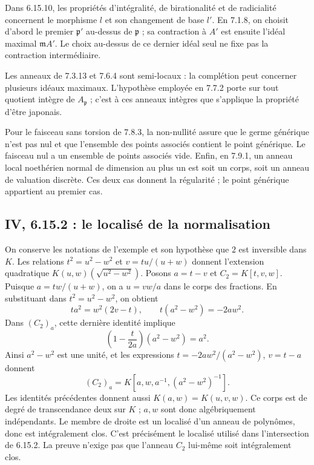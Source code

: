 \documentclass[11pt,a4paper]{article}
\begin{document}
Dans 6.15.10, les propriétés d'intégralité, de birationalité et de
radicialité concernent le morphisme $l$ et son changement de base $l'$.
En 7.1.8, on choisit d'abord le premier $\mathfrak p'$ au-dessus de
$\mathfrak p$ ; sa contraction à $A'$ est ensuite l'idéal maximal
$\mathfrak mA'$. Le choix au-dessus de ce dernier idéal seul ne fixe pas
la contraction intermédiaire.

Les anneaux de 7.3.13 et 7.6.4 sont semi-locaux : la complétion peut
concerner plusieurs idéaux maximaux. L'hypothèse employée en 7.7.2 porte
sur tout quotient intègre de $A_{\mathfrak p}$ ; c'est à ces anneaux
intègres que s'applique la propriété d'être japonais.

Pour le faisceau sans torsion de 7.8.3, la non-nullité assure que le
germe générique n'est pas nul et que l'ensemble des points associés
contient le point générique. Le faisceau nul a un ensemble de points
associés vide. Enfin, en 7.9.1, un anneau local noethérien normal de
dimension au plus un est soit un corps, soit un anneau de valuation
discrète. Ces deux cas donnent la régularité ; le point générique
appartient au premier cas.

\subsection{IV, 6.15.2 : le localisé de la normalisation}
\label{note:iv2-normalization}
On conserve les notations de l'exemple et son hypothèse que $2$ est
inversible dans $K$. Les relations $t^2=u^2-w^2$ et $v=tu/(u+w)$
donnent l'extension quadratique $K(u,w)(\sqrt{u^2-w^2})$.
Posons $a=t-v$ et $C_2=K[t,v,w]$. Puisque $a=tw/(u+w)$,
on a $u=vw/a$ dans le corps des fractions. En substituant dans
$t^2=u^2-w^2$, on obtient
\[
 t a^2=w^2(2v-t),\qquad t(a^2-w^2)=-2aw^2.
\]
Dans $(C_2)_a$, cette dernière identité implique
\[
 \left(1-\frac{t}{2a}\right)(a^2-w^2)=a^2.
\]
Ainsi $a^2-w^2$ est une unité, et les expressions
$t=-2aw^2/(a^2-w^2)$, $v=t-a$ donnent
\[
 (C_2)_a=K[a,w,a^{-1},(a^2-w^2)^{-1}].
\]
Les identités précédentes donnent aussi $K(a,w)=K(u,v,w)$.
Ce corps est de degré de transcendance deux sur $K$ ; $a,w$ sont donc
algébriquement indépendants. Le membre de droite est un localisé d'un
anneau de polynômes, donc est intégralement clos. C'est précisément le
localisé utilisé dans l'intersection de 6.15.2. La preuve n'exige pas
que l'anneau $C_2$ lui-même soit intégralement clos.
\end{document}
